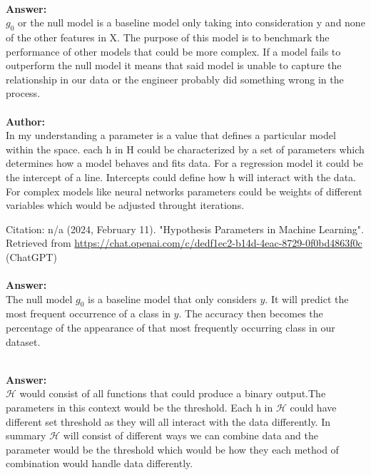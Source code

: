 \documentclass[12pt]{article}
\begin{document}
\begin{enumerate}
\\
\textbf{Answer: } \\
$g_0$ or the null model is a baseline model only taking into consideration y and none of the other features in X. The purpose of this model is to benchmark the performance of other models that could be more complex. If a model fails to outperform the null model it means that said model is unable to capture the relationship in our data or the engineer probably did something wrong in the process. \\ 


\\
\textbf{Author: } \\ 
In my understanding a parameter is a value that defines a particular model within the space. each h in H could be characterized by a set of parameters which determines how a model behaves and fits data. For a regression model it could be the intercept of a line. Intercepts could define how h will interact with the data. For complex models like neural networks parameters could be weights of different variables which would be adjusted throught iterations.

Citation: n/a (2024, February 11). "Hypothesis Parameters in Machine Learning". Retrieved from \url{https://chat.openai.com/c/dedf1ec2-b14d-4eac-8729-0f0bd4863f0c} (ChatGPT)\\

\\
\textbf{Answer: } \\ 

The null model $g_0$ is a baseline model that only considers  $y$. It will predict the most frequent occurrence of a class in $y$. The accuracy then becomes the percentage of the appearance of that most frequently occurring class in our dataset.

\\
\textbf{Answer: } \\ 
$\mathcal{H}$ would consist of all functions that could produce a binary output.The parameters in this context would be the threshold. Each h in $\mathcal{H}$ could have different set threshold as they will all interact with the data differently. In summary $\mathcal{H}$ will consist of different ways we can combine data and the parameter would be the threshold which would be how they each method of combination would handle data differently. 


\end{enumerate}
\end{document}
